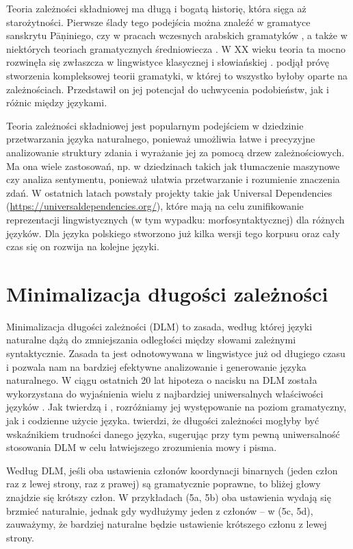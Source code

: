 \documentclass[licencjacka]{pracamgr_Kogni}
\begin{document}
Teoria zależności składniowej ma długą i bogatą historię, która sięga aż starożytności. Pierwsze ślady tego podejścia można znaleźć w gramatyce sanskrytu Pāṇiniego, czy w pracach wczesnych arabskich gramatyków \citep{Kruijff2002}, a także w niektórych teoriach gramatycznych średniowiecza \citep{Covington1984}. W XX wieku teoria ta mocno rozwinęła się zwłaszcza w lingwistyce klasycznej i słowiańskiej \citep{Melcuk1988}. \citet{Tesniere1959} podjął próvę stworzenia kompleksowej teorii gramatyki, w której to wszystko byłoby oparte na zależnościach. Przedstawił on jej potencjał do uchwycenia podobieństw, jak i różnic między językami.

Teoria zależności składniowej jest popularnym podejściem w dziedzinie przetwarzania języka naturalnego, ponieważ umożliwia łatwe i precyzyjne analizowanie struktury zdania i wyrażanie jej za pomocą drzew zależnościowych. Ma ona wiele zastosowań, np. w dziedzinach takich jak tłumaczenie maszynowe czy analiza sentymentu, ponieważ ułatwia przetwarzanie i rozumienie znaczenia zdań. W ostatnich latach powstały projekty takie jak Universal Dependencies (\url{https://universaldependencies.org/}), które mają na celu zunifikowanie reprezentacji lingwistycznych (w tym wypadku: morfosyntaktycznej) dla różnych języków. Dla języka polskiego stworzono już kilka wersji tego korpusu \citep{Przepiorkowski2020} oraz cały czas się on rozwija na kolejne języki.

\section{Minimalizacja długości zależności}
Minimalizacja długości zależności (DLM) to zasada, według której języki naturalne dążą do zmniejszania odległości między słowami zależnymi syntaktycznie. Zasada ta jest odnotowywana w lingwistyce już od długiego czasu i pozwala nam na bardziej efektywne analizowanie i generowanie języka naturalnego. W ciągu ostatnich 20 lat hipoteza o nacisku na DLM została wykorzystana do wyjaśnienia wielu z najbardziej uniwersalnych właściwości języków \citep{FutrellEtAl2015}.
Jak twierdzą \citet{Hawkins1994} i \citet{FutrellEtAl2020}, rozróżniamy jej występowanie na poziom gramatyczny, jak i codzienne użycie języka. \citet{Liu2008} twierdzi, że długości zależności mogłyby być wskaźnikiem trudności danego języka, sugerując przy tym pewną uniwersalność stosowania DLM w celu łatwiejszego zrozumienia mowy i pisma.

Według DLM, jeśli oba ustawienia członów koordynacji binarnych (jeden człon raz z lewej strony, raz z prawej) są gramatycznie poprawne, to bliżej głowy znajdzie się krótszy człon. W przykładach (5a, 5b) oba ustawienia wydają się brzmieć naturalnie, jednak gdy wydłużymy jeden z członów -- w (5c, 5d), zauważymy, że bardziej naturalne będzie ustawienie krótszego członu z lewej strony.
\\
\end{document}
